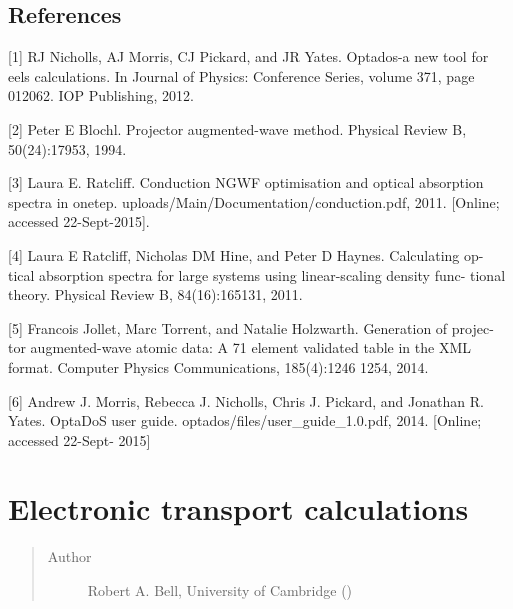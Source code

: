 \documentclass[letterpaper,10pt,english]{sphinxmanual}
\begin{document}
\subsection{References}
\label{\detokenize{eels_in_onetep:references}}
\begin{DUlineblock}{0em}
\item[] {[}1{]} RJ Nicholls, AJ Morris, CJ Pickard, and JR Yates. Optados-a new tool
for eels calculations. In Journal of Physics: Conference Series, volume 371,
page 012062. IOP Publishing, 2012.
\item[] {[}2{]} Peter E Blochl. Projector augmented-wave method. Physical Review B,
50(24):17953, 1994.
\item[] {[}3{]} Laura E. Ratcliff. Conduction NGWF optimisation and optical absorption
spectra in onetep. 
uploads/Main/Documentation/conduction.pdf, 2011. {[}Online; accessed
22-Sept-2015{]}.
\item[] {[}4{]} Laura E Ratcliff, Nicholas DM Hine, and Peter D Haynes. Calculating op-
tical absorption spectra for large systems using linear-scaling density func-
tional theory. Physical Review B, 84(16):165131, 2011.
\item[] {[}5{]} Francois Jollet, Marc Torrent, and Natalie Holzwarth. Generation of projec-
tor augmented-wave atomic data: A 71 element validated table in the XML
format. Computer Physics Communications, 185(4):1246 \textendash{} 1254, 2014.
\item[] {[}6{]} Andrew J. Morris, Rebecca J. Nicholls, Chris J. Pickard, and Jonathan R.
Yates. OptaDoS user guide. 
optados/files/user\_guide\_1.0.pdf, 2014. {[}Online; accessed 22-Sept-
2015{]}
\end{DUlineblock}


\section{Electronic transport calculations}
\label{\detokenize{transport:electronic-transport-calculations}}\label{\detokenize{transport::doc}}\begin{quote}\begin{description}
\item[{Author}] \leavevmode
Robert A. Bell, University of Cambridge ()

\end{description}\end{quote}
\end{document}
